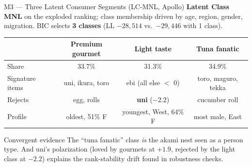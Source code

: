 \documentclass[10pt,aspectratio=169]{beamer}
\begin{document}
\begin{frame}{M3 — Three Latent Consumer Segments (LC-MNL, Apollo)}
  \textbf{Latent Class MNL} on the exploded ranking; class membership driven by
  age, region, gender, migration. BIC selects \textbf{3 classes}
  (LL $-28{,}514$ vs.\ $-29{,}446$ with 1 class).

  \vspace{4pt}
  \begin{table}
    \small
    \begin{tabular}{lccc}
      \toprule
      & \textbf{Premium gourmet} & \textbf{Light taste} & \textbf{Tuna fanatic} \\
      \midrule
      Share            & 33.7\% & 31.3\% & 34.9\% \\
      Signature items  & uni, ikura, toro & ebi (all else $<$ 0) & toro, maguro, tekka \\
      Rejects          & egg, rolls & \textbf{uni} ($-2.2$) & cucumber roll \\
      Profile          & oldest, 51\% F & youngest, West, 64\% F & most male, East \\
      \bottomrule
    \end{tabular}
  \end{table}

  \vspace{6pt}
  \begin{block}{Convergent evidence}
    The ``tuna fanatic'' class \emph{is} the akami nest seen as a person type.
    And uni's polarization (loved by gourmets at $+1.9$, rejected by the light
    class at $-2.2$) explains the rank-stability drift found in robustness checks.
  \end{block}
\end{frame}
\end{document}
